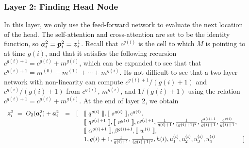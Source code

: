 \subsubsection{Layer 2: Finding Head Node}
In this layer, we only use the feed-forward network to evaluate the next location of the head.
The self-attention and cross-attention are set to be the identity function, so ${\bm{a}}_i^2={\bm{p}}_i^2={\bm{z}}_i^1$.
Recall that $c^{g(i)}$ is the cell to which $M$ is pointing to at time $g(i)$, and that it satisfies the following recursion $c^{g(i)+1}=c^{g(i)}+m^{g(i)}$, which can be expanded to see that
that $c^{g(i)+1}=m^{(0)}+m^{(1)}+\cdots + m^{g(i)}$.
Its not difficult to see that a two layer network with non-linearity can compute $c^{g(i)+1}/(g(i)+1)$ and $c^{g(i)}/(g(i)+1)$ from $c^{g(i)}$, $m^{g(i)}$, and $1/(g(i)+1)$ using the relation $c^{g(i)+1}=c^{g(i)}+m^{g(i)}$.
At the  end of layer 2, we obtain 
\begin{equation*}
\begin{array}{rcllr}
{\bm{z}}^2_i  \ = \ O_2({\bm{a}}^2_i) + {\bm{a}}^2_i & = & [ 
& \llbracket\ q^{g(i)}\ \rrbracket,\llbracket\ s^{g(i)}\ \rrbracket,c^{g(i)}, \\
&&& \llbracket\ q^{g(i)+1}\ \rrbracket,\llbracket\ v^{g(i)}\ \rrbracket,c^{g(i)+1},\frac{1}{g(i)+1},\frac{1}{(g(i)+1)^2},\frac{c^{g(i)+1}}{g(i)+1},\frac{c^{g(i)}}{g(i)+1}, \\
&&& \llbracket\ \alpha^{g(i)+1}\ \rrbracket,\beta^{g(i)+1},\llbracket\ w^{(i)}\ \rrbracket, \\
&&& 1,g(i)+1,\frac{1}{g(i)+1},\frac{1}{(g(i)+1)^2},h(i),u_1^{(i)},u_2^{(i)},u_3^{(i)},u_4^{(i)} & ] 
\end{array}
\end{equation*}

